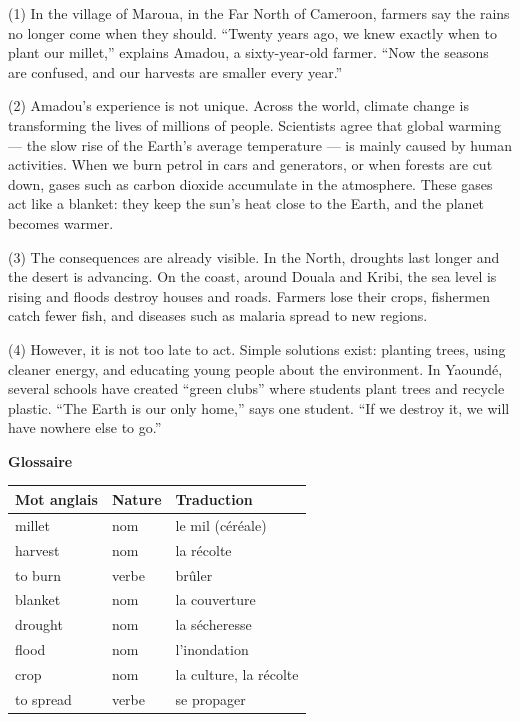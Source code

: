 \documentclass[11pt]{article}
\begin{document}
\begin{textebox}
(1) In the village of Maroua, in the Far North of Cameroon, farmers say the rains no longer come when they should. “Twenty years ago, we knew exactly when to plant our millet,” explains Amadou, a sixty-year-old farmer. “Now the seasons are confused, and our harvests are smaller every year.”

(2) Amadou's experience is not unique. Across the world, climate change is transforming the lives of millions of people. Scientists agree that global warming — the slow rise of the Earth's average temperature — is mainly caused by human activities. When we burn petrol in cars and generators, or when forests are cut down, gases such as carbon dioxide accumulate in the atmosphere. These gases act like a blanket: they keep the sun's heat close to the Earth, and the planet becomes warmer.

(3) The consequences are already visible. In the North, droughts last longer and the desert is advancing. On the coast, around Douala and Kribi, the sea level is rising and floods destroy houses and roads. Farmers lose their crops, fishermen catch fewer fish, and diseases such as malaria spread to new regions.

(4) However, it is not too late to act. Simple solutions exist: planting trees, using cleaner energy, and educating young people about the environment. In Yaoundé, several schools have created “green clubs” where students plant trees and recycle plastic. “The Earth is our only home,” says one student. “If we destroy it, we will have nowhere else to go.”
\end{textebox}

\textbf{Glossaire}

\begin{center}
\begin{tabularx}{\linewidth}{|l|l|X|}
\hline
\rowcolor{popblueL} \textbf{Mot anglais} & \textbf{Nature} & \textbf{Traduction} \\
\hline
millet & nom & le mil (céréale) \\
\hline
harvest & nom & la récolte \\
\hline
to burn & verbe & brûler \\
\hline
blanket & nom & la couverture \\
\hline
drought & nom & la sécheresse \\
\hline
flood & nom & l'inondation \\
\hline
crop & nom & la culture, la récolte \\
\hline
to spread & verbe & se propager \\
\hline
\end{tabularx}
\end{center}
\end{document}
